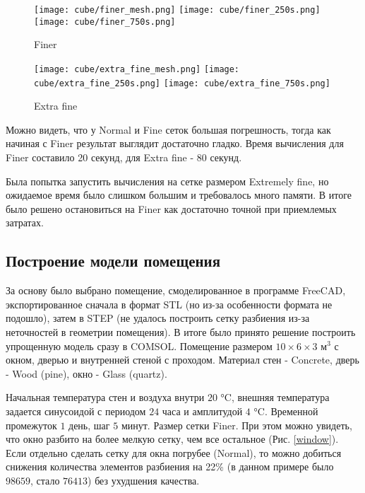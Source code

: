 \begin{figure}[H]
\texttt{[image: cube/finer\_mesh.png]}\hfill
\texttt{[image: cube/finer\_250s.png]}\hfill
\texttt{[image: cube/finer\_750s.png]}\hfill
\caption{Finer}
\label{cube-finer}
\end{figure}

\begin{figure}[H]
\texttt{[image: cube/extra\_fine\_mesh.png]}\hfill
\texttt{[image: cube/extra\_fine\_250s.png]}\hfill
\texttt{[image: cube/extra\_fine\_750s.png]}\hfill
\caption{Extra fine}
\label{cube-extra-fine}
\end{figure}

Можно видеть, что у Normal и Fine сеток большая погрешность, тогда как начиная с Finer результат выглядит достаточно гладко. Время вычисления для Finer составило 20 секунд, для Extra fine - 80 секунд.\par
Была попытка запустить вычисления на сетке размером Extremely fine, но ожидаемое время было слишком большим и требовалось много памяти. В итоге было решено остановиться на Finer как достаточно точной при приемлемых затратах.

\newpage


\subsection{Построение модели помещения}

За основу было выбрано помещение, смоделированное в программе FreeCAD, экспортированное сначала в формат STL (но из-за особенности формата не подошло), затем в STEP (не удалось построить сетку разбиения из-за неточностей в геометрии помещения). В итоге было принято решение построить упрощенную модель сразу в COMSOL. Помещение размером $10 \times 6 \times 3 \text{ м}^3$ с окном, дверью и внутренней стеной с проходом. Материал стен - Concrete, дверь - Wood (pine), окно - Glass (quartz).

Начальная температура стен и воздуха внутри $20$ °C, внешняя температура задается синусоидой с периодом $24$ часа и амплитудой $4$ °C.
Временной промежуток $1$ день, шаг $5$ минут. Размер сетки Finer. При этом можно увидеть, что окно разбито на более мелкую сетку, чем все остальное (Рис. \ref{window}). Если отдельно сделать сетку для окна погрубее (Normal), то можно добиться снижения количества элементов разбиения на 22\% (в данном примере было $98659$, стало $76413$) без ухудшения качества.

